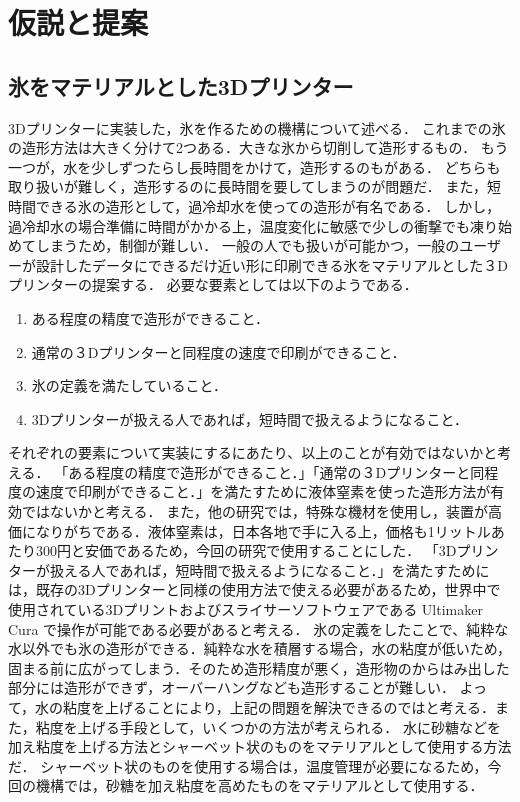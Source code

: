 \chapter{仮説と提案}
\label{chp:first}

\section{氷をマテリアルとした3Dプリンター}
\label{sec:paragraph}

3Dプリンターに実装した，氷を作るための機構について述べる．
これまでの氷の造形方法は大きく分けて2つある．大きな氷から切削して造形するもの．
もう一つが，水を少しずつたらし長時間をかけて，造形するのもがある．
どちらも取り扱いが難しく，造形するのに長時間を要してしまうのが問題だ．
また，短時間できる氷の造形として，過冷却水を使っての造形が有名である．
しかし，過冷却水の場合準備に時間がかかる上，温度変化に敏感で少しの衝撃でも凍り始めてしまうため，制御が難しい．
一般の人でも扱いが可能かつ，一般のユーザーが設計したデータにできるだけ近い形に印刷できる氷をマテリアルとした３Dプリンターの提案する．
必要な要素としては以下のようである．

\begin{enumerate}
  \item ある程度の精度で造形ができること． 
  \item 通常の３Dプリンターと同程度の速度で印刷ができること．
  \item 氷の定義を満たしていること．
  \item 3Dプリンターが扱える人であれば，短時間で扱えるようになること．
 \end{enumerate}

それぞれの要素について実装にするにあたり、以上のことが有効ではないかと考える．
「ある程度の精度で造形ができること．」「通常の３Dプリンターと同程度の速度で印刷ができること．」を満たすために液体窒素を使った造形方法が有効ではないかと考える．
また，他の研究では，特殊な機材を使用し，装置が高価になりがちである．液体窒素は，日本各地で手に入る上，価格も1リットルあたり300円と安価であるため，今回の研究で使用することにした．
「3Dプリンターが扱える人であれば，短時間で扱えるようになること．」を満たすためには，既存の3Dプリンターと同様の使用方法で使える必要があるため，世界中で使用されている3Dプリントおよびスライサーソフトウェアである Ultimaker Cura で操作が可能である必要があると考える．
氷の定義をしたことで、純粋な水以外でも氷の造形ができる．純粋な水を積層する場合，水の粘度が低いため，固まる前に広がってしまう．そのため造形精度が悪く，造形物のからはみ出した部分には造形ができず，オーバーハングなども造形することが難しい．
よって，水の粘度を上げることにより，上記の問題を解決できるのではと考える．また，粘度を上げる手段として，いくつかの方法が考えられる．
水に砂糖などを加え粘度を上げる方法とシャーベット状のものをマテリアルとして使用する方法だ．
シャーベット状のものを使用する場合は，温度管理が必要になるため，今回の機構では，砂糖を加え粘度を高めたものをマテリアルとして使用する．


